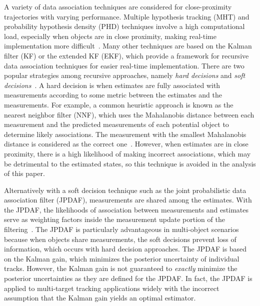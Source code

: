 \documentclass[letterpaper, paper,10pt]{AAS}		%
\begin{document}
A variety of data association techniques are considered for close-proximity trajectories with varying performance.
Multiple hypothesis tracking (MHT) and probability hypothesis density (PHD) techniques involve a high computational load, especially when objects are in close proximity, making real-time implementation more difficult~\cite{MHT1,PHD1,PHD2}.
Many other techniques are based on the Kalman filter (KF) or the extended KF (EKF), which provide a framework for recursive data association techniques for easier real-time implementation.
There are two popular strategies among recursive approaches, namely \emph{hard decisions} and \emph{soft decisions}~\cite{JPDAF1}.
A hard decision is when estimates are fully associated with measurements according to some metric between the estimates and the measurements.
For example, a common heuristic approach is known as the nearest neighbor filter (NNF), which uses the Mahalanobis distance between each measurement and the predicted measurements of each potential object to determine likely associations.
The measurement with the smallest Mahalanobis distance is considered as the correct one~\cite{NN2}.
However, when estimates are in close proximity, there is a high likelihood of making incorrect associations, which may be detrimental to the estimated states, so this technique is avoided in the analysis of this paper.

Alternatively with a soft decision technique such as the joint probabilistic data association filter (JPDAF), measurements are shared among the estimates. With the JPDAF, the likelihoods of association between measurements and estimates serve as weighting factors inside the measurement update portion of the filtering~\cite{JPDAF1,TrackDataAssoc}.
The JPDAF is particularly advantageous in multi-object scenarios because when objects share measurements, the soft decisions prevent loss of information, which occurs with hard decision approaches.
The JPDAF is based on the Kalman gain, which minimizes the posterior uncertainty of individual tracks.
However, the Kalman gain is not guaranteed to \emph{exactly} minimize the posterior uncertainties as they are defined for the JPDAF.
In fact, the JPDAF is applied to multi-target tracking applications widely with the incorrect assumption that the Kalman gain yields an optimal estimator.
\end{document}
